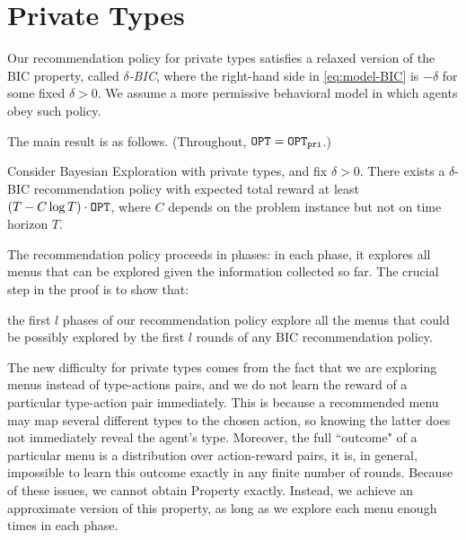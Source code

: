 
\section{Private Types}
\label{sec:private_nc}

Our recommendation policy for private types satisfies a relaxed version of the BIC property, called \emph{$\delta$-BIC}, where the right-hand side in \eqref{eq:model-BIC} is $-\delta$ for some fixed $\delta>0$. We assume a more permissive behavioral model in which agents obey such policy.

The main result is as follows. (Throughout, $\mathtt{OPT} = \mathtt{OPT}_{\mathtt{pri}}$.)


\begin{theorem}
\label{thm:private_nocc}
Consider Bayesian Exploration with private types, and fix $\delta > 0$. There exists a $\delta$-BIC recommendation policy with expected total reward at least $\left(T - C \log T \right) \cdot \mathtt{OPT}$, where $C$ depends on the problem instance but not on time horizon $T$.
\end{theorem}


The recommendation policy proceeds in phases: in each phase, it explores all menus that can be explored given the information collected so far. The crucial step in the proof is to show that:

\begin{property}
\item the first $l$ phases of our recommendation policy explore all the menus that could be possibly explored by the first $l$ rounds of any BIC recommendation policy.
    \label{prop:private-exploration}
\end{property}

The new difficulty for private types comes from the fact that we are exploring menus instead of type-actions pairs, and we do not learn the reward of a particular type-action pair immediately. This is because a recommended menu may map several different types to the chosen action, so knowing the latter does not immediately reveal the agent's type. Moreover, the full ``outcome" of a particular menu is a distribution over action-reward pairs, it is, in general, impossible to learn this outcome exactly in any finite number of rounds.  Because of these issues, we cannot obtain Property  exactly. Instead, we achieve an approximate version of this property, as long as we explore each menu enough times in each phase.

